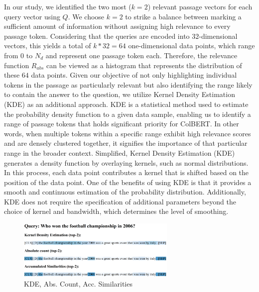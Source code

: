 \documentclass[11pt]{article}
\begin{document}
In our study, we identified the two most ($k=2$) relevant passage vectors for each query vector using $Q$.
We choose $k=2$ to strike a balance between marking a sufficient amount of information without assigning high relevance to every passage token. 
Considering that the queries are encoded into $32$-dimensional vectors, 
this yields a total of $k*32=64$ one-dimensional data points, which range from $0$ to $N_d$ and represent one passage token each.
Therefore, the relevance function $R_{abs}$ can be viewed as a histogram that represents the distribution of these $64$ data points. 
Given our objective of not only highlighting individual tokens in the passage as particularly relevant but also identifying the range likely to contain the answer to the question, we utilize Kernel Density Estimation (KDE)\cite{kde} as an additional approach. 
KDE is a statistical method used to estimate the probability density function to a given data sample, enabling us to identify a range of passage tokens that holds significant priority for ColBERT.
In other words, when multiple tokens within a specific range exhibit high relevance scores and are densely clustered together, it signifies the importance of that particular range in the broader context.
Simplified, Kernel Density Estimation (KDE) generates a density function by overlaying kernels, such as normal distributions.
In this process, each data point contributes a kernel that is shifted based on the position of the data point.
One of the benefits of using KDE is that it provides a smooth and continuous estimation of the probability distribution. 
Additionally, KDE does not require the specification of additional parameters beyond the choice of kernel and bandwidth, 
which determines the level of smoothing.

\begin{figure}[h]
	\includegraphics[width = 7.6cm, left]{"./images/heatmap1.png"}
	\caption{KDE, Abs. Count, Acc. Similarities}
	\label{fig:example1}
\end{figure}
\end{document}
